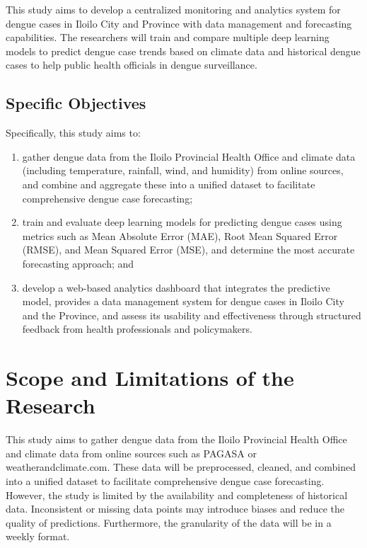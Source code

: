 This study aims to develop a centralized monitoring and analytics system for dengue cases in Iloilo City and Province with data management and forecasting capabilities. 
The researchers will train and compare multiple deep learning models to predict dengue case trends based on climate data and 
historical dengue cases to help public health officials in dengue surveillance.


\subsection{Specific Objectives}
\label{sec:specificobjectives}

%
%

Specifically, this study aims to:


\begin{enumerate}
	\item gather dengue data from the Iloilo Provincial Health Office and climate data (including temperature, rainfall, wind, and humidity) from online sources, and combine and aggregate these into a unified dataset to facilitate comprehensive dengue case forecasting;
	\item train and evaluate deep learning models for predicting dengue cases using metrics such as Mean Absolute Error (MAE), Root Mean Squared Error (RMSE), and Mean Squared Error (MSE), and determine the most accurate forecasting approach; and
	\item develop a web-based analytics dashboard that integrates the predictive model, provides a data management system for dengue cases in Iloilo City and the Province, and assess its usability and effectiveness through structured feedback from health professionals and policymakers.
\end{enumerate}

\section{Scope and Limitations of the Research}
\label{sec:scopelimitations}

This study aims to gather dengue data from the Iloilo Provincial Health Office and climate data from online sources such as PAGASA or weatherandclimate.com. These data will be preprocessed, cleaned, and combined into a unified dataset to facilitate comprehensive dengue case forecasting. However, the study is limited by the availability and completeness of historical data. Inconsistent or missing data points may introduce biases and reduce the quality of predictions. Furthermore, the granularity of the data will be in a weekly format.

